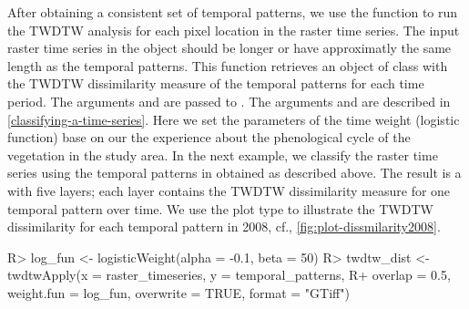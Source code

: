 \documentclass[article,shortnames]{jss}
\begin{document}
After obtaining a consistent set of temporal patterns, we use the
function  to run the TWDTW analysis for each pixel
location in the raster time series. The input raster time series in the
object  should be longer or have approximatly the same
length as the temporal patterns. This function retrieves an object of
class  with the TWDTW dissimilarity measure of the
temporal patterns for each time period. The arguments 
and  are passed to . The
arguments  and  are described in
\autoref{classifying-a-time-series}. Here we set the parameters of the
time weight (logistic function) base on our the experience about the
phenological cycle of the vegetation in the study area. In the next
example, we classify the raster time series using the temporal patterns
in  obtained as described above. The result is a
 with five layers; each layer contains the TWDTW
dissimilarity measure for one temporal pattern over time. We use the
plot type  to illustrate the TWDTW dissimilarity for each
temporal pattern in 2008, cf., \autoref{fig:plot-dissmilarity2008}.

\begin{CodeChunk}

\begin{CodeInput}
R> log_fun <- logisticWeight(alpha = -0.1, beta = 50) 
R> twdtw_dist <- twdtwApply(x = raster_timeseries, y = temporal_patterns, 
R+   overlap = 0.5, weight.fun = log_fun, overwrite = TRUE, format = "GTiff")
\end{CodeInput}
\end{CodeChunk}
\end{document}
